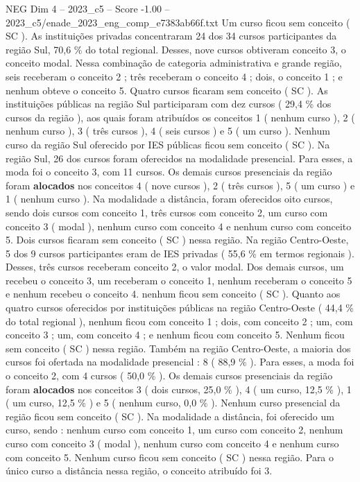 \begin{textsample}{NEG Dim 4 – 2023\_c5 – Score -1.00 – 2023\_c5/enade\_2023\_eng\_comp\_e7383ab66f.txt}
Um curso ficou sem conceito ( SC ).
As instituições privadas concentraram 24 dos 34 cursos participantes da região Sul, 70,6 \% do total regional.
Desses, nove cursos obtiveram conceito 3, o conceito modal.
Nessa combinação de categoria administrativa e grande região, seis receberam o conceito 2 ; três receberam o conceito 4 ; dois, o conceito 1 ; e nenhum obteve o conceito 5.
Quatro cursos ficaram sem conceito ( SC ).
As instituições públicas na região Sul participaram com dez cursos ( 29,4 \% dos cursos da região ), aos quais foram atribuídos os conceitos 1 ( nenhum curso ), 2 ( nenhum curso ), 3 ( três cursos ), 4 ( seis cursos ) e 5 ( um curso ).
Nenhum curso da região Sul oferecido por IES públicas ficou sem conceito ( SC ).
Na região Sul, 26 dos cursos foram oferecidos na modalidade presencial.
Para esses, a moda foi o conceito 3, com 11 cursos.
Os demais cursos presenciais da região foram \textbf{alocados} nos conceitos 4 ( nove cursos ), 2 ( três cursos ), 5 ( um curso ) e 1 ( nenhum curso ).
Na modalidade a distância, foram oferecidos oito cursos, sendo dois cursos com conceito 1, três cursos com conceito 2, um curso com conceito 3 ( modal ), nenhum curso com conceito 4 e nenhum curso com conceito 5.
Dois cursos ficaram sem conceito ( SC ) nessa região.
Na região Centro-Oeste, 5 dos 9 cursos participantes eram de IES privadas ( 55,6 \% em termos regionais ).
Desses, três cursos receberam conceito 2, o valor modal.
Dos demais cursos, um recebeu o conceito 3, um receberam o conceito 1, nenhum receberam o conceito 5 e nenhum recebeu o conceito 4. nenhum ficou sem conceito ( SC ).
Quanto aos quatro cursos oferecidos por instituições públicas na região Centro-Oeste ( 44,4 \% do total regional ), nenhum ficou com conceito 1 ; dois, com conceito 2 ; um, com conceito 3 ; um, com conceito 4 ; e nenhum ficou com conceito 5.
Nenhum ficou sem conceito ( SC ) nessa região.
Também na região Centro-Oeste, a maioria dos cursos foi ofertada na modalidade presencial : 8 ( 88,9 \% ).
Para esses, a moda foi o conceito 2, com 4 cursos ( 50,0 \% ).
Os demais cursos presenciais da região foram \textbf{alocados} nos conceitos 3 ( dois cursos, 25,0 \% ), 4 ( um curso, 12,5 \% ), 1 ( um curso, 12,5 \% ) e 5 ( nenhum curso, 0,0 \% ).
Nenhum curso presencial da região ficou sem conceito ( SC ).
Na modalidade a distância, foi oferecido um curso, sendo : nenhum curso com conceito 1, um curso com conceito 2, nenhum curso com conceito 3 ( modal ), nenhum curso com conceito 4 e nenhum curso com conceito 5.
Nenhum curso ficou sem conceito ( SC ) nessa região.
Para o único curso a distância nessa região, o conceito atribuído foi 3.

\end{textsample}

